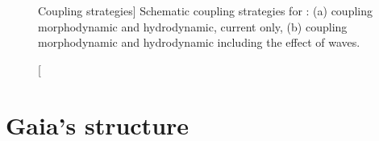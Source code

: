 \begin{figure}[H]%
\begin{center}
%
\hfil
%
%
\hfil
%
%
\hfil
\mbox{}
\end{center}
\caption
[Coupling strategies]
{Schematic coupling strategies for \gaia: (a) coupling morphodynamic and hydrodynamic, current only, (b) coupling morphodynamic and hydrodynamic including the effect of waves.}
\label{fig:CouplingStrategies}
\end{figure}

\pagebreak

\section{Gaia's structure}

